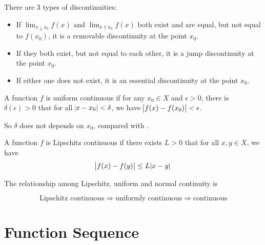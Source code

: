 \begin{definition}
    There are 3 types of discontinuities:
    \begin{itemize}
        \item If $\lim_{x \downarrow x_0} f(x)$ and $\lim_{x \uparrow x_0} f(x)$ both exist and are equal, but not equal to $f(x_0)$, it is a removable discontinuity at the point $x_0$.
        \item If they both exist, but not equal to each other, it is a jump discontinuity at the point $x_0$.
        \item If either one does not exist, it is an essential discontinuity at the point $x_0$.
    \end{itemize}
\end{definition}

\begin{definition}
    A function $f$ is uniform continuous if for any $x_0 \in X$ and $\epsilon > 0$, there is $\delta(\epsilon) > 0$ that for all $\abs{x - x_0} < \delta$, we have $\abs{f(x) - f(x_0)} < \epsilon$.
    
    So $\delta$ does not depends on $x_0$, compared with .
\end{definition}

\begin{definition}
    A function $f$ is Lipschitz continuous if there exists $L > 0$ that for all $x,y \in X$, we have 
    \begin{equation}
        \abs{f(x) - f(y)} \leq L \abs{x - y}
    \end{equation}
\end{definition}

\begin{theorem}
    The relationship among Lipschitz, uniform and normal continuity is
    
    \begin{equation}
        \text{Lipschitz continuous} \Rightarrow \text{uniformly continuous} \Rightarrow \text{continuous}
    \end{equation}    
\end{theorem}


\section{Function Sequence}

